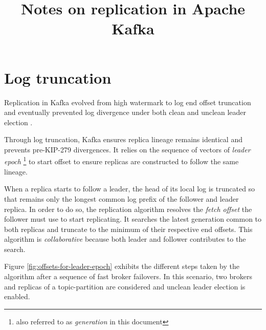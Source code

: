 \documentclass{article}
\title{Notes on replication in Apache Kafka}
\begin{document}
\section{Log truncation}

Replication in Kafka evolved from high watermark to log end offset truncation \cite{KIP101} and eventually prevented log divergence under both clean and unclean leader election \cite{KIP279}.

Through log truncation, Kafka ensures replica lineage remains identical and prevents pre-KIP-279 divergences. It relies on the sequence of vectors of \textit{leader epoch} \footnote{also referred to as \textit{generation} in this document} to start offset to ensure replicas are constructed to follow the same lineage.

When a replica starts to follow a leader, the head of its local log is truncated so that remains only the longest common log prefix of the follower and leader replica. In order to do so, the replication algorithm resolves the \textit{fetch offset} the follower must use to start replicating. It searches the latest generation common to both replicas and truncate to the minimum of their respective end offsets. This algorithm is \textit{collaborative} because both leader and follower contributes to the search.

Figure \ref{fig:offsets-for-leader-epoch} exhibits the different steps taken by the algorithm after a sequence of fast broker failovers. In this scenario, two brokers and replicas of a topic-partition are considered and unclean leader election is enabled.
\end{document}
